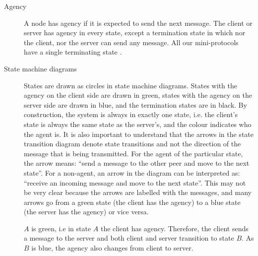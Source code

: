 \begin{description}
\item[Agency]
  A node has agency if it is expected to send the next message.
  The client or server has agency in every state, except a termination state in which nor the client, nor the server can send any message. All our mini-protocols have a single terminating state \StDone{}.

\item [State machine diagrams]
      States are drawn as circles in state machine diagrams.
      States with the agency on the client side are drawn in green, states with the agency on the server side are drawn in blue, and
      the termination states are in black.
      By construction, the system is always in exactly one state,
      i.e. the client's state is always the same state as the server's,
      and the colour indicates who the agent is.
      It is also important to understand that the arrows in the state transition diagram denote
      state transitions and not the direction of the message that is being transmitted.
      For the agent of the particular state, the arrow means: ``send a message to the
      other peer and move to the next state''.
      For a non-agent, an arrow in the diagram can be interpreted as:
      ``receive an incoming message and move to the next state''.
      This may not be very clear because the arrows are labelled with the messages, and
      many arrows go from a green state (the client has the agency) to a blue
      state (the server has the agency) or vice versa.


      $A$ is green, i.e in state $A$ the client has agency.
      Therefore, the client sends a message to the server and
      both client and server transition to state $B$.
      As $B$ is blue, the agency also changes from client to server.



\end{description}

